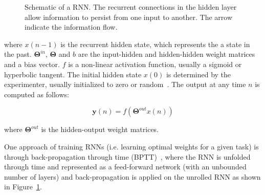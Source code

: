 \documentclass{WitsPhysicsReport}
\begin{document}
\begin{figure}[H]
\centering
{}
 \caption{Schematic of a RNN. The recurrent connections in the hidden layer allow information to persist from one input to another. The arrow indicate the information flow.}
 \label{fig:RNN_cell}
\end{figure}

where $x(n-1)$ is the recurrent hidden state, which represents the a state in the past. $\mathbf{\Theta}^{in}$, $\mathbf{\Theta}$ and $b$ are the input-hidden and hidden-hidden weight matrices and a bias vector. $f$ is a non-linear activation function, usually a sigmoid or hyperbolic tangent. The initial hidden state $x(0)$ is determined by the experimenter, usually initialized  to zero or random~\cite{pascanu2013difficulty}. The output at any time $n$ is computed as follows:

\begin{equation}
\mathbf{y}(n) = f(\mathbf{\Theta}^{out} x(n))
\label{equ:rnn_out}
\end{equation}

where $\mathbf{\Theta}^{out}$ is the hidden-output weight matrices.


One approach of training RNNs (i.e. learning optimal weights for a given task) is through back-propagation through time (BPTT)~\cite{Rumelhart:1986:LIR:104279.104293,rumelhart1986learning}, where the RNN is unfolded through time and represented as a feed-forward network (with an unbounded number of layers) and back-propagation is applied on the unrolled RNN as shown in Figure~\ref{fig:RNN_cell}.
\end{document}
